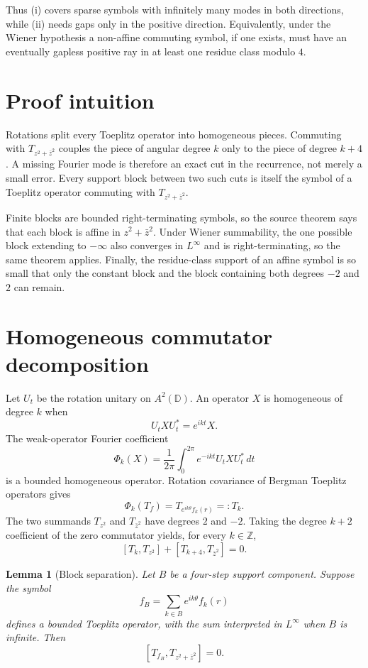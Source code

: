 \documentclass[11pt]{article}
\newtheorem{lemma}{Lemma}
\newcommand{\D}{\mathbb D}
\begin{document}
Thus (i) covers sparse symbols with infinitely many modes in both directions,
while (ii) needs gaps only in the positive direction.  Equivalently, under
the Wiener hypothesis a non-affine commuting symbol, if one exists, must have
an eventually gapless positive ray in at least one residue class modulo $4$.

\section{Proof intuition}

Rotations split every Toeplitz operator into homogeneous pieces.  Commuting
with $T_{z^2+\bar z^2}$ couples the piece of angular degree $k$ only to the
piece of degree $k+4$.  A missing Fourier mode is therefore an exact cut in
the recurrence, not merely a small error.  Every support block between two
such cuts is itself the symbol of a Toeplitz operator commuting with
$T_{z^2+\bar z^2}$.

Finite blocks are bounded right-terminating symbols, so the source theorem
says that each block is affine in $z^2+\bar z^2$.  Under Wiener summability,
the one possible block extending to $-\infty$ also converges in
$L^\infty$ and is right-terminating, so the same theorem applies.  Finally,
the residue-class support of an affine symbol is so small that only the
constant block and the block containing both degrees $-2$ and $2$ can remain.

\section{Homogeneous commutator decomposition}

Let $U_t$ be the rotation unitary on $A^2(\D)$.  An operator $X$ is
homogeneous of degree $k$ when
\[
                         U_tXU_t^*=e^{ikt}X.
\]
The weak-operator Fourier coefficient
\[
                 \Phi_k(X)=\frac1{2\pi}\int_0^{2\pi}
                 e^{-ikt}U_tXU_t^*\,dt
\]
is a bounded homogeneous operator.  Rotation covariance of Bergman Toeplitz
operators gives
\[
                  \Phi_k(T_f)=T_{e^{ik\theta}f_k(r)}=:T_k.
\]
The two summands $T_{z^2}$ and $T_{\bar z^2}$ have degrees $2$ and $-2$.
Taking the degree $k+2$ coefficient of the zero commutator yields, for every
$k\in\mathbb Z$,
\begin{equation}\label{eq:chain}
             [T_k,T_{z^2}]+[T_{k+4},T_{\bar z^2}]=0.
\end{equation}

\begin{lemma}[Block separation]\label{lem:block}
Let $B$ be a four-step support component.  Suppose the symbol
\[
                         f_B=\sum_{k\in B}e^{ik\theta}f_k(r)
\]
defines a bounded Toeplitz operator, with the sum interpreted in
$L^\infty$ when $B$ is infinite.  Then
\[
                         [T_{f_B},T_{z^2+\bar z^2}]=0.
\]
\end{lemma}
\end{document}
